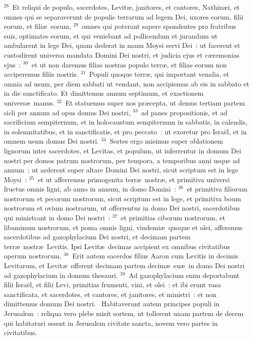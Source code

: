 ${}^{28}$~Et reliqui de populo, sacerdotes, Levit\ae , janitores, et cantores, Nathin\ae i, et omnes qui se separaverunt de populis terrarum ad legem Dei, uxores eorum, filii eorum, et fili\ae\ eorum,
${}^{29}$~omnes qui poterant sapere spondentes pro fratribus suis, optimates eorum, et qui veniebant ad pollicendum et jurandum ut ambularent in lege Dei, quam dederat in manu Moysi servi Dei~: ut facerent et custodirent universa mandata Domini Dei nostri, et judicia ejus et c\ae remonias ejus~:
${}^{30}$~et ut non daremus filias nostras populo terr\ae , et filias eorum non acciperemus filiis nostris.
${}^{31}$~Populi quoque terr\ae , qui important venalia, et omnia ad usum, per diem sabbati ut vendant, non accipiemus ab eis in sabbato et in die sanctificato. Et dimittemus annum septimum, et exactionem univers\ae\ manus.
${}^{32}$~Et statuemus super nos pr\ae cepta, ut demus tertiam partem sicli per annum ad opus domus Dei nostri,
${}^{33}$~ad panes propositionis, et ad sacrificium sempiternum, et in holocaustum sempiternum in sabbatis, in calendis, in solemnitatibus, et in sanctificatis, et pro peccato~: ut exoretur pro Isra\"el, et in omnem usum domus Dei nostri.
${}^{34}$~Sortes ergo misimus super oblationem lignorum inter sacerdotes, et Levitas, et populum, ut inferrentur in domum Dei nostri per domos patrum nostrorum, per tempora, a temporibus anni usque ad annum~: ut arderent super altare Domini Dei nostri, sicut scriptum est in lege Moysi~:
${}^{35}$~et ut afferremus primogenita terr\ae\ nostr\ae , et primitiva universi fructus omnis ligni, ab anno in annum, in domo Domini~:
${}^{36}$~et primitiva filiorum nostrorum et pecorum nostrorum, sicut scriptum est in lege, et primitiva boum nostrorum et ovium nostrarum, ut offerrentur in domo Dei nostri, sacerdotibus qui ministrant in domo Dei nostri~:
${}^{37}$~et primitias ciborum nostrorum, et libaminum nostrorum, et poma omnis ligni, vindemi\ae\ quoque et olei, afferemus sacerdotibus ad gazophylacium Dei nostri, et decimam partem terr\ae\ nostr\ae\ Levitis. Ipsi Levit\ae\ decimas accipient ex omnibus civitatibus operum nostrorum.
${}^{38}$~Erit autem sacerdos filius Aaron cum Levitis in decimis Levitarum, et Levit\ae\ offerent decimam partem decim\ae\ su\ae\ in domo Dei nostri ad gazophylacium in domum thesauri.
${}^{39}$~Ad gazophylacium enim deportabunt filii Isra\"el, et filii Levi, primitias frumenti, vini, et olei~: et ibi erunt vasa sanctificata, et sacerdotes, et cantores, et janitores, et ministri~: et non dimittemus domum Dei nostri.
~\lettrine[lines=10,image=true,loversize=0.05,lraise=-0.03]{H}{}abitaverunt autem principes populi in Jerusalem~: reliqua vero plebs misit sortem, ut tollerent unam partem de decem qui habitaturi essent in Jerusalem civitate sancta, novem vero partes in civitatibus.
